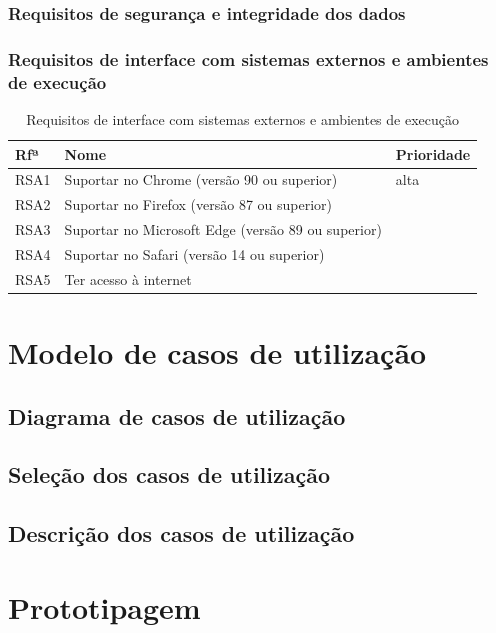\documentclass[11pt, twoside]{report}
\begin{document}
	\subsection{Requisitos de segurança e integridade dos dados}
	\subsection{Requisitos de interface com sistemas externos e ambientes de execução}
	
		\begin{table}[H]
		\centering
		\caption{Requisitos de interface com sistemas externos e ambientes de execução}	
		\vspace{0.5cm}
		\begin{tabular}{|l|l|l|}
			\hline
			Rfª & Nome & Prioridade\\
			\hline
			RSA1 & Suportar no Chrome (versão 90 ou superior) &alta\\
			\hline
			RSA2 &Suportar no Firefox (versão 87 ou superior) &\\
			\hline
			RSA3 &Suportar no Microsoft Edge (versão 89 ou superior)&\\
			\hline
			RSA4 &Suportar no Safari (versão 14 ou superior)&\\
			\hline
			RSA5 &Ter acesso à internet&\\
			\hline
		\end{tabular}
		\label{requisitosdesistemas}
	\end{table}
	
	\chapter{Modelo de casos de utilização}
	\section{Diagrama de casos de utilização}
	\section{Seleção dos casos de utilização}
	\section{Descrição dos casos de utilização}
	
	\chapter{Prototipagem}
\end{document}
